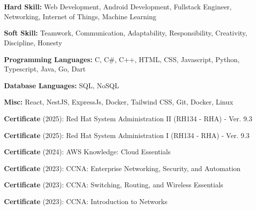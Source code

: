 \documentclass[../main.tex]{subfiles}
\begin{document}
\section{}
\begin{highlights}
    \item \textbf{Hard Skill:} Web Development, Android Development, Fullstack Engineer, Networking, Internet of Things, Machine Learning
    \item \textbf{Soft Skill:} Teamwork, Communication, Adaptability, Responsibility, Creativity, Discipline, Honesty
    \item \textbf{Programming Languages:} C, C\#, C++, HTML, CSS, Javascript, Python, Typescript, Java, Go, Dart
    \item \textbf{Database Languages:} SQL, NoSQL
    \item \textbf{Misc:} React, NestJS, ExpressJs, Docker, Tailwind CSS, Git, Docker, Linux
    \item \textbf{Certificate} (2025): Red Hat System Administration II (RH134 - RHA) - Ver. 9.3
    \item \textbf{Certificate} (2025): Red Hat System Administration I (RH134 - RHA) - Ver. 9.3
    \item \textbf{Certificate} (2024): AWS Knowledge: Cloud Essentials
    \item \textbf{Certificate} (2023): CCNA: Enterprise Networking, Security, and Automation
    \item \textbf{Certificate} (2023): CCNA: Switching, Routing, and Wireless Essentials
    \item \textbf{Certificate} (2023): CCNA: Introduction to Networks
\end{highlights}
\end{document}
